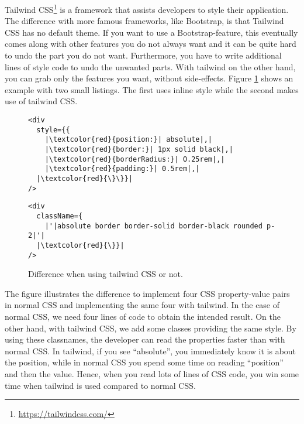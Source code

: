 Tailwind CSS\footnote{\url{https://tailwindcss.com/}} is a framework that assists developers to style their application. The difference with more famous frameworks, like Bootstrap, is that Tailwind CSS has no default theme. If you want to use a Bootstrap-feature, this eventually comes along with other features you do not always want and it can be quite hard to undo the part you do not want. Furthermore, you have to write additional lines of style code to undo the unwanted parts. With tailwind on the other hand, you can grab only the features you want, without side-effects. Figure \ref{fig:examplecode-tailwindcss} shows an example with two small listings. The first uses inline style while the second makes use of tailwind CSS.

\begin{figure}[H]
	\begin{minipage}[b]{0.5\textwidth}
 		\centering
  		\begin{verbatim}
<div
  style={{
    |\textcolor{red}{position:}| absolute|,|
    |\textcolor{red}{border:}| 1px solid black|,|
    |\textcolor{red}{borderRadius:}| O.25rem|,|
    |\textcolor{red}{padding:}| 0.5rem|,|
  |\textcolor{red}{\}\}}|
/>
		\end{verbatim}
		\label{lst:no-tailwind}
	\end{minipage}
 	\begin{minipage}[b]{0.5\textwidth}
  		\centering
		\begin{verbatim}
<div
  className={
    |'|absolute border border-solid border-black rounded p-2|'|
  |\textcolor{red}{\}}|
/>
		\end{verbatim}
		\label{lst:tailwind}
 	\end{minipage}
	\caption{Difference when using tailwind CSS or not.}
	\label{fig:examplecode-tailwindcss}
\end{figure}

The figure illustrates the difference to implement four CSS property-value pairs in normal CSS and implementing the same four with tailwind. In the case of normal CSS, we need four lines of code to obtain the intended result. On the other hand, with tailwind CSS, we add some classes providing the same style. By using these classnames, the developer can read the properties faster than with normal CSS. In tailwind, if you see ``absolute'', you immediately know it is about the position, while in normal CSS you spend some time on reading ``position'' and then the value. Hence, when you read lots of lines of CSS code, you win some time when tailwind is used compared to normal CSS.\\

